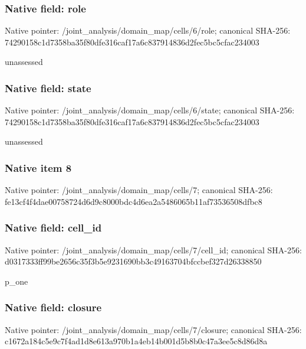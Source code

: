 \documentclass[10pt,a4paper]{article}
\begin{document}
\subsubsection{Native field: role}
Native pointer: /joint\_\allowbreak{}analysis/domain\_\allowbreak{}map/cells/6/role; canonical SHA-256: 74290158c1d7358ba35f80dfe316caf17a6c837914836d2fec5bc5cfac234003

\begingroup\raggedright\sloppy unassessed\par\endgroup

\subsubsection{Native field: state}
Native pointer: /joint\_\allowbreak{}analysis/domain\_\allowbreak{}map/cells/6/state; canonical SHA-256: 74290158c1d7358ba35f80dfe316caf17a6c837914836d2fec5bc5cfac234003

\begingroup\raggedright\sloppy unassessed\par\endgroup

\subsubsection{Native item 8}
Native pointer: /joint\_\allowbreak{}analysis/domain\_\allowbreak{}map/cells/7; canonical SHA-256: fe13cf4f4dae00758724d6d9c8000bdc4d6ea2a5486065b11af73536508dfbc8

\subsubsection{Native field: cell\_\allowbreak{}id}
Native pointer: /joint\_\allowbreak{}analysis/domain\_\allowbreak{}map/cells/7/cell\_\allowbreak{}id; canonical SHA-256: d0317333ff99be2656c35f3b5e9231690bb3c49163704bfccbef327d26338850

\begingroup\raggedright\sloppy p\_\allowbreak{}one\par\endgroup

\subsubsection{Native field: closure}
Native pointer: /joint\_\allowbreak{}analysis/domain\_\allowbreak{}map/cells/7/closure; canonical SHA-256: c1672a184c5e9c7f4ad1d8e613a970b1a4eb14b001d5b8b0c47a3ee5c8d86d8a
\end{document}
